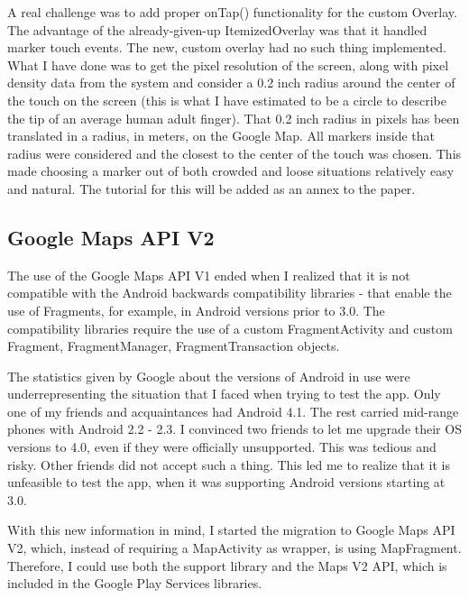 \documentclass{article}
\begin{document}
A real challenge was to add proper onTap() functionality for the custom Overlay.
The advantage of the already-given-up ItemizedOverlay was that it handled marker
touch events. The new, custom overlay had no such thing implemented. What I have
done was to get the pixel resolution of the screen, along with pixel density
data from the system and consider a 0.2 inch radius around the center of the
touch on the screen (this is what I have estimated to be a circle to describe
the tip of an average human adult finger). That 0.2 inch radius in pixels has
been translated in a radius, in meters, on the Google Map. All markers inside
that radius were considered and the closest to the center of the touch was
chosen. This made choosing a marker out of both crowded and loose situations
relatively easy and natural. The tutorial for this will be added as an annex to
the paper.\newline

\subsection{Google Maps API V2}

The use of the Google Maps API V1 ended when I realized that it is not
compatible with the Android backwards compatibility libraries - that enable the
use of Fragments, for example, in Android versions prior to 3.0. The
compatibility libraries require the use of a custom FragmentActivity and custom
Fragment, FragmentManager, FragmentTransaction objects. \newline

The statistics given by Google about the versions of Android in use were
underrepresenting the situation that I faced when trying to test the app. Only
one of my friends and acquaintances had Android 4.1. The rest carried mid-range
phones with Android 2.2 - 2.3. I convinced two friends to let me upgrade their
OS versions to 4.0, even if they were officially unsupported. This was tedious
and risky. Other friends did not accept such a thing. This led me to realize
that it is unfeasible to test the app, when it was supporting Android versions
starting at 3.0. \newline

With this new information in mind, I started the migration to Google Maps API
V2, which, instead of requiring a MapActivity as wrapper, is using MapFragment.
Therefore, I could use both the support library and the Maps V2 API, which is
included in the Google Play Services libraries.\newline
\end{document}
